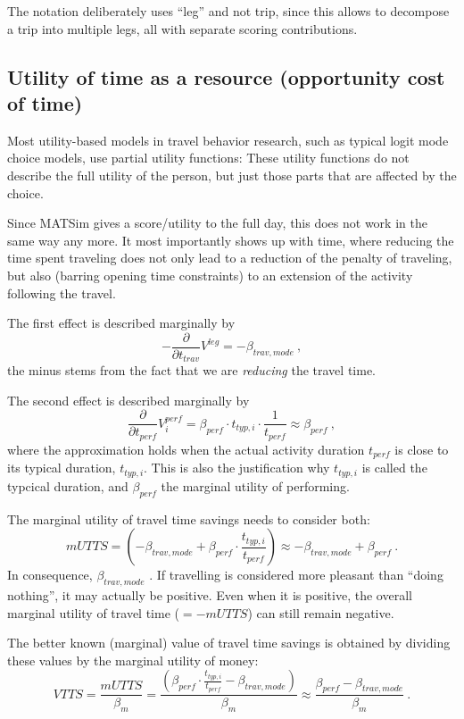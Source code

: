 The notation deliberately uses ``leg'' and not trip, since this allows to decompose a trip into multiple legs, all with separate scoring contributions.

\subsection{Utility of time as a resource (opportunity cost of time)}
\label{sec:utl-of-time-as-resource}

Most utility-based models in travel behavior research, such as typical logit mode choice models, use partial utility functions: These utility functions do not describe the full utility of the person, but just those parts that are affected by the choice.

Since MATSim gives a score/utility to the full day, this does not work in the same way any more.  It most importantly shows up with time, where reducing the time spent traveling does not only lead to a reduction of the penalty of traveling, but also (barring opening time constraints) to an extension of the activity following the travel.

The first effect is described marginally by
\[
- \frac{\partial}{\partial t_{trav}} V^{leg} = - \beta_{trav,mode} \ ,
\]
the minus stems from the fact that we are \emph{reducing} the travel time.

The second effect is described marginally by
\[
\frac{\partial}{\partial t_{perf}} V^{perf}_i
%
= \beta_{perf} \cdot t_{typ,i} \cdot \frac{1}{t_{perf}}
%
\approx \beta_{perf} \ ,
\]
where the approximation holds when the actual activity duration $t_{perf}$ is close to its typical duration, $t_{typ,i}$.  This is also the justification why $t_{typ,i}$ is called the typcical duration, and $\beta_{perf}$ the marginal utility of performing.

The marginal utility of travel time savings needs to consider both:
\[
mUTTS 
%
= \left( - \beta_{trav,mode} + \beta_{perf} \cdot \frac{t_{typ,i}}{t_{perf}} \right)
%
\approx - \beta_{trav,mode} + \beta_{perf} \ .
\]
In consequence, $\beta_{trav,mode}$ .  If travelling is considered more pleasant than ``doing nothing'', it may actually be positive.  Even when it is positive, the overall marginal utility of travel time ($= -mUTTS$) can still remain negative.

The better known (marginal) value of travel time savings is obtained by dividing these values by the marginal utility of money:
\[
VTTS = \frac{mUTTS}{\beta_m} 
%
= \frac{\left( \beta_{perf} \cdot \frac{t_{typ,i}}{t_{perf}} - \beta_{trav,mode} \right)}{\beta_m}
%
\approx \frac{\beta_{perf} - \beta_{trav,mode}}{\beta_m} \ .
\]



